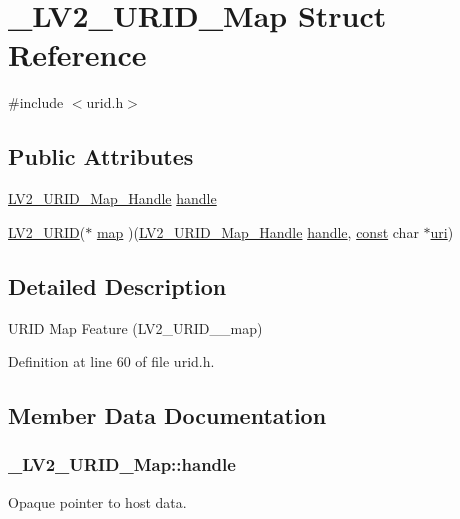 \hypertarget{struct___l_v2___u_r_i_d___map}{}\section{\+\_\+\+L\+V2\+\_\+\+U\+R\+I\+D\+\_\+\+Map Struct Reference}
\label{struct___l_v2___u_r_i_d___map}


{\ttfamily \#include $<$urid.\+h$>$}

\subsection*{Public Attributes}
\begin{DoxyCompactItemize}
\item 
\hyperlink{urid_8h_a31c6a9fffc31cd109185df2556765c4c}{L\+V2\+\_\+\+U\+R\+I\+D\+\_\+\+Map\+\_\+\+Handle} \hyperlink{struct___l_v2___u_r_i_d___map_a19150b0e12e748ddc70a039c8557a4ce}{handle}
\item 
\hyperlink{urid_8h_a5ff0630d245539e9f6dca10ff3c40fae}{L\+V2\+\_\+\+U\+R\+ID}($\ast$ \hyperlink{struct___l_v2___u_r_i_d___map_a560d625bc0aacd00fd8e6e1e2915bf1a}{map} )(\hyperlink{urid_8h_a31c6a9fffc31cd109185df2556765c4c}{L\+V2\+\_\+\+U\+R\+I\+D\+\_\+\+Map\+\_\+\+Handle} \hyperlink{struct___l_v2___u_r_i_d___map_a19150b0e12e748ddc70a039c8557a4ce}{handle}, \hyperlink{getopt1_8c_a2c212835823e3c54a8ab6d95c652660e}{const} char $\ast$\hyperlink{lib_2expat_8h_a5a9fdd6c2606370ad12f24c078ac6585}{uri})
\end{DoxyCompactItemize}


\subsection{Detailed Description}
U\+R\+ID Map Feature (L\+V2\+\_\+\+U\+R\+I\+D\+\_\+\+\_\+map) 

Definition at line 60 of file urid.\+h.



\subsection{Member Data Documentation}
\subsubsection[{\texorpdfstring{handle}{handle}}]{ \+\_\+\+L\+V2\+\_\+\+U\+R\+I\+D\+\_\+\+Map\+::handle}\hypertarget{struct___l_v2___u_r_i_d___map_a19150b0e12e748ddc70a039c8557a4ce}{}\label{struct___l_v2___u_r_i_d___map_a19150b0e12e748ddc70a039c8557a4ce}
Opaque pointer to host data.

